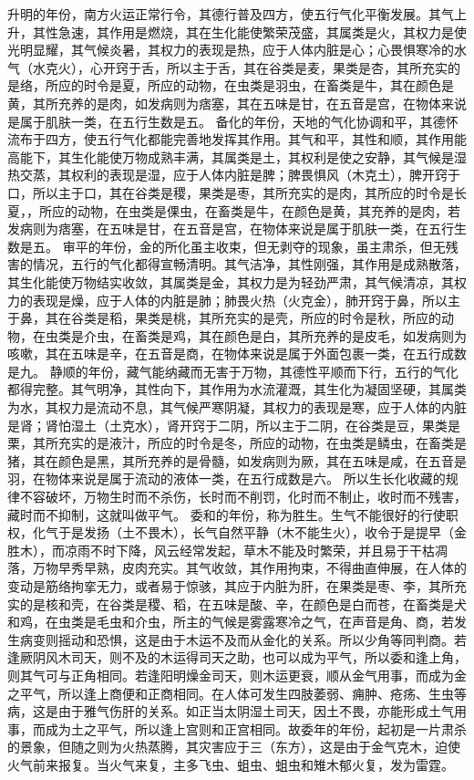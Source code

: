 \documentclass[a4paper,12pt,UTF8,twoside]{ctexbook}
\begin{document}
升明的年份，南方火运正常行令，其德行普及四方，使五行气化平衡发展。其气上升，其性急速，其作用是燃烧，其在生化能使繁荣茂盛，其属类是火，其权力是使光明显耀，其气候炎暑，其权力的表现是热，应于人体内脏是心；心畏惧寒冷的水气（水克火），心开窍于舌，所以主于舌，其在谷类是麦，果类是杏，其所充实的是络，所应的时令是夏，所应的动物，在虫类是羽虫，在畜类是牛，其在颜色是黄，其所充养的是肉，如发病则为痞塞，其在五味是甘，在五音是宫，在物体来说是属于肌肤一类，在五行生数是五。
备化的年份，天地的气化协调和平，其德怀流布于四方，使五行气化都能完善地发挥其作用。其气和平，其性和顺，其作用能高能下，其生化能使万物成熟丰满，其属类是土，其权利是使之安静，其气候是湿热交蒸，其权利的表现是湿，应于人体内脏是脾；脾畏惧风（木克土），脾开窍于口，所以主于口，其在谷类是稷，果类是枣，其所充实的是肉，其所应的时令是长夏，，所应的动物，在虫类是倮虫，在畜类是牛，在颜色是黄，其充养的是肉，若发病则为痞塞，在五味是甘，在五音是宫，在物体来说是属于肌肤一类，在五行生数是五。
审平的年份，金的所化虽主收束，但无剥夺的现象，虽主肃杀，但无残害的情况，五行的气化都得宣畅清明。其气洁净，其性刚强，其作用是成熟散落，其生化能使万物结实收敛，其属类是金，其权力是为轻劲严肃，其气候清凉，其权力的表现是燥，应于人体的内脏是肺；肺畏火热（火克金），肺开窍于鼻，所以主于鼻，其在谷类是稻，果类是桃，其所充实的是壳，所应的时令是秋，所应的动物，在虫类是介虫，在畜类是鸡，其在颜色是白，其所充养的是皮毛，如发病则为咳嗽，其在五味是辛，在五音是商，在物体来说是属于外面包裹一类，在五行成数是九。
静顺的年份，藏气能纳藏而无害于万物，其德性平顺而下行，五行的气化都得完整。其气明净，其性向下，其作用为水流灌溉，其生化为凝固坚硬，其属类为水，其权力是流动不息，其气候严寒阴凝，其权力的表现是寒，应于人体的内脏是肾；肾怕湿土（土克水），肾开窍于二阴，所以主于二阴，在谷类是豆，果类是栗，其所充实的是液汁，所应的时令是冬，所应的动物，在虫类是鳞虫，在畜类是猪，其在颜色是黑，其所充养的是骨髓，如发病则为厥，其在五味是咸，在五音是羽，在物体来说是属于流动的液体一类，在五行成数是六。
所以生长化收藏的规律不容破坏，万物生时而不杀伤，长时而不削罚，化时而不制止，收时而不残害，藏时而不抑制，这就叫做平气。
委和的年份，称为胜生。生气不能很好的行使职权，化气于是发扬（土不畏木），长气自然平静（木不能生火），收令于是提早（金胜木），而凉雨不时下降，风云经常发起，草木不能及时繁荣，并且易于干枯凋落，万物早秀早熟，皮肉充实。其气收敛，其作用拘束，不得曲直伸展，在人体的变动是筋络拘挛无力，或者易于惊骇，其应于内脏为肝，在果类是枣、李，其所充实的是核和壳，在谷类是稷、稻，在五味是酸、辛，在颜色是白而苍，在畜类是犬和鸡，在虫类是毛虫和介虫，所主的气候是雾露寒冷之气，在声音是角、商，若发生病变则摇动和恐惧，这是由于木运不及而从金化的关系。所以少角等同判商。若逢厥阴风木司天，则不及的木运得司天之助，也可以成为平气，所以委和逢上角，则其气可与正角相同。若逢阳明燥金司天，则木运更衰，顺从金气用事，而成为金之平气，所以逢上商便和正商相同。在人体可发生四肢萎弱、痈肿、疮疡、生虫等病，这是由于雅气伤肝的关系。如正当太阴湿土司天，因土不畏，亦能形成土气用事，而成为土之平气，所以逢上宫则和正宫相同。故委年的年份，起初是一片肃杀的景象，但随之则为火热蒸腾，其灾害应于三（东方），这是由于金气克木，迫使火气前来报复。当火气来复，主多飞虫、蛆虫、蛆虫和雉木郁火复，发为雷霆。
\end{document}

